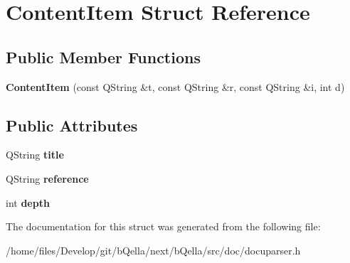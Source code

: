 \hypertarget{structContentItem}{
\section{ContentItem Struct Reference}
\label{structContentItem}
}
\subsection*{Public Member Functions}
\begin{DoxyCompactItemize}
\item 
\hypertarget{structContentItem_a89001011cdcf1567478cdbe6c4699b32}{
{\bfseries ContentItem} (const QString \&t, const QString \&r, const QString \&i, int d)}
\label{structContentItem_a89001011cdcf1567478cdbe6c4699b32}

\end{DoxyCompactItemize}
\subsection*{Public Attributes}
\begin{DoxyCompactItemize}
\item 
\hypertarget{structContentItem_ace13788d5a83bd789dab1e44ca8b5be9}{
QString {\bfseries title}}
\label{structContentItem_ace13788d5a83bd789dab1e44ca8b5be9}

\item 
\hypertarget{structContentItem_ae2f2d4ff82bb720e177414cc3b0738b4}{
QString {\bfseries reference}}
\label{structContentItem_ae2f2d4ff82bb720e177414cc3b0738b4}

\item 
\hypertarget{structContentItem_a0b2f5810620f26a7459b063c8325de6d}{
int {\bfseries depth}}
\label{structContentItem_a0b2f5810620f26a7459b063c8325de6d}

\end{DoxyCompactItemize}


The documentation for this struct was generated from the following file:\begin{DoxyCompactItemize}
\item 
/home/files/Develop/git/bQella/next/bQella/src/doc/docuparser.h\end{DoxyCompactItemize}
